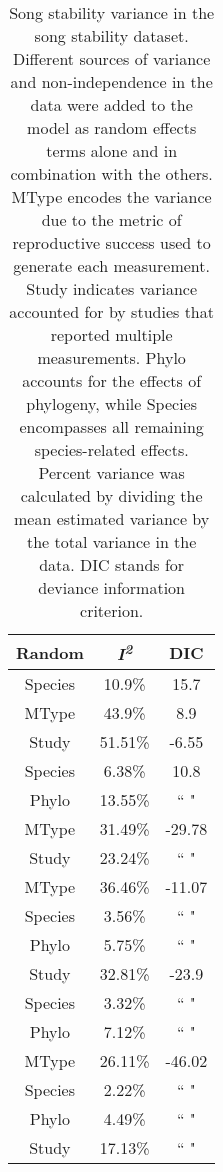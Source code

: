 \documentclass{article}
\begin{document}
  \begin{table}[H]
  \centering
  \caption{Song stability variance in the song stability dataset.  Different sources of variance and non-independence in the data were added to the model as random effects terms alone and in combination with the others.  MType encodes the variance due to the metric of reproductive success used to generate each measurement.  Study indicates variance accounted for by studies that reported multiple measurements. Phylo accounts for the effects of phylogeny, while Species encompasses all remaining species-related effects. Percent variance was calculated by dividing the mean estimated variance by the total variance in the data. DIC stands for deviance information criterion.}
  \label{fig:Main}
  \begin{tabular}{ccc}
  \hline
  Random & \textit{I\textsuperscript{2}} & DIC \\ 
  \hline
  Species & 10.9\% & 15.7 \\ \hdashline
  MType & 43.9\% & 8.9 \\ \hdashline
  Study & 51.51\% & -6.55 \\ \hdashline
  Species & 6.38\% & 10.8 \\ 
  Phylo & 13.55\% & `` " \\ \hdashline
  MType & 31.49\% & -29.78 \\ 
  Study & 23.24\% & `` " \\ \hdashline
  MType & 36.46\% & -11.07 \\ 
  Species & 3.56\% & `` " \\ 
  Phylo & 5.75\% & `` " \\ \hdashline
  Study & 32.81\% & -23.9 \\ 
  Species & 3.32\% & `` " \\ 
  Phylo & 7.12\% & `` " \\ \hdashline
  MType & 26.11\% & -46.02 \\ 
  Species & 2.22\% & `` " \\ 
  Phylo & 4.49\% & `` " \\ 
  Study & 17.13\% & `` " \\
  \hline
  \end{tabular}
  \end{table}
  
\end{document}
